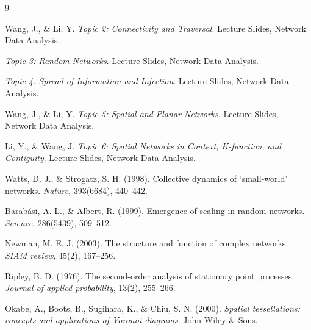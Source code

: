 \documentclass[conference]{IEEEtran}
\begin{document}
\begin{thebibliography}{9}

Wang, J., \& Li, Y. \emph{Topic 2: Connectivity and Traversal}. Lecture Slides, Network Data Analysis.

\emph{Topic 3: Random Networks}. Lecture Slides, Network Data Analysis.

\emph{Topic 4: Spread of Information and Infection}. Lecture Slides, Network Data Analysis.

Wang, J., \& Li, Y. \emph{Topic 5: Spatial and Planar Networks}. Lecture Slides, Network Data Analysis.

Li, Y., \& Wang, J. \emph{Topic 6: Spatial Networks in Context, K-function, and Contiguity}. Lecture Slides, Network Data Analysis.

Watts, D. J., \& Strogatz, S. H. (1998). Collective dynamics of `small-world' networks. \emph{Nature}, 393(6684), 440--442.

Barab\'{a}si, A.-L., \& Albert, R. (1999). Emergence of scaling in random networks. \emph{Science}, 286(5439), 509--512.

Newman, M. E. J. (2003). The structure and function of complex networks. \emph{SIAM review}, 45(2), 167--256.

Ripley, B. D. (1976). The second-order analysis of stationary point processes. \emph{Journal of applied probability}, 13(2), 255--266.

Okabe, A., Boots, B., Sugihara, K., \& Chiu, S. N. (2000). \emph{Spatial tessellations: concepts and applications of Voronoi diagrams}. John Wiley \& Sons.

\end{thebibliography}
\end{document}
